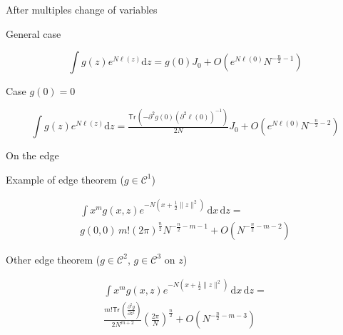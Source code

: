 \documentclass{beamer}
\newcommand{\dd}{\mathrm{d}}
\newcommand{\dparn}[3]{\frac{\partial^{#3} {#1}}{\partial{#2}^{#3}}}
\newcommand{\Tr}{\mathsf{Tr}\,}
\newcommand{\class}[1]{{\mathscr{C}^{#1}}}
\begin{document}
\begin{frame}{After multiples change of variables}

  \begin{center}
    \large \hspace{2cm} General case \onslide<3>{($g \in \class 1$)}
  \end{center}
  \[\int g(z)e^{N\ell(z)} \dd z = g(0) J_0+ O(e^{N\ell(0)} N^{-\frac n 2 -1})\]

  \vfill \pause{}

\begin{center}
    \large \hspace{2.5cm}Case $g(0) = 0$ \onslide<3>{($g \in \class 3$)}
  \end{center}
  \[\int g(z)e^{N \ell(z)} \dd z =
    \tfrac{\Tr\left(-\partial^2 g(0) {\left(\partial^2 \ell(0)\right)}^{-1}\right)}{2N}
    J_0
    + O\left(e^{N\ell(0)}{N^{-\frac n 2 -2}}\right)\]
\end{frame}

\begin{frame}{On the edge}
  \begin{block}{Example of edge theorem ($g \in \class1$)}

      \vspace{-4mm}

    \begin{multline*}
      \int x^m g(x,z)e^{-N(x + \frac 12 \|z\|^2)} \,\dd x\, \dd z =\\
      g(0,0)\,m! {(2\pi)}^{\frac n 2} N^{-\frac n 2 - m - 1} + O(N^{-\frac n 2 - m
        - 2})
    \end{multline*}

      \vspace{-3mm}

  \end{block}

  \pause{}

    \begin{block}{Other edge theorem ($g \in \class 2$, $g \in \class 3$ on $z$)}

      \vspace{-4mm}

    \begin{multline*}
      \int x^m g(x,z)e^{-N(x + \frac 12 \|z\|^2)} \,\dd x\, \dd z
    =\\ \frac{m!\Tr\left(\dparn g z 2\right)}{2N^{m+2}}
    {\left(\frac {2\pi}{N}\right)}^{\frac n 2}
    + O\left({N^{-\frac n 2 -m -3}}\right)
    \end{multline*}

      \vspace{-3mm}


  \end{block}



\end{frame}
\end{document}
